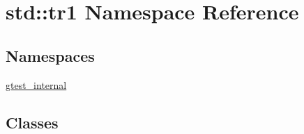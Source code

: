 \hypertarget{namespacestd_1_1tr1}{}\section{std\+:\+:tr1 Namespace Reference}
\label{namespacestd_1_1tr1}
\subsection*{Namespaces}
\begin{DoxyCompactItemize}
\item 
 \hyperlink{namespacestd_1_1tr1_1_1gtest__internal}{gtest\+\_\+internal}
\end{DoxyCompactItemize}
\subsection*{Classes}
